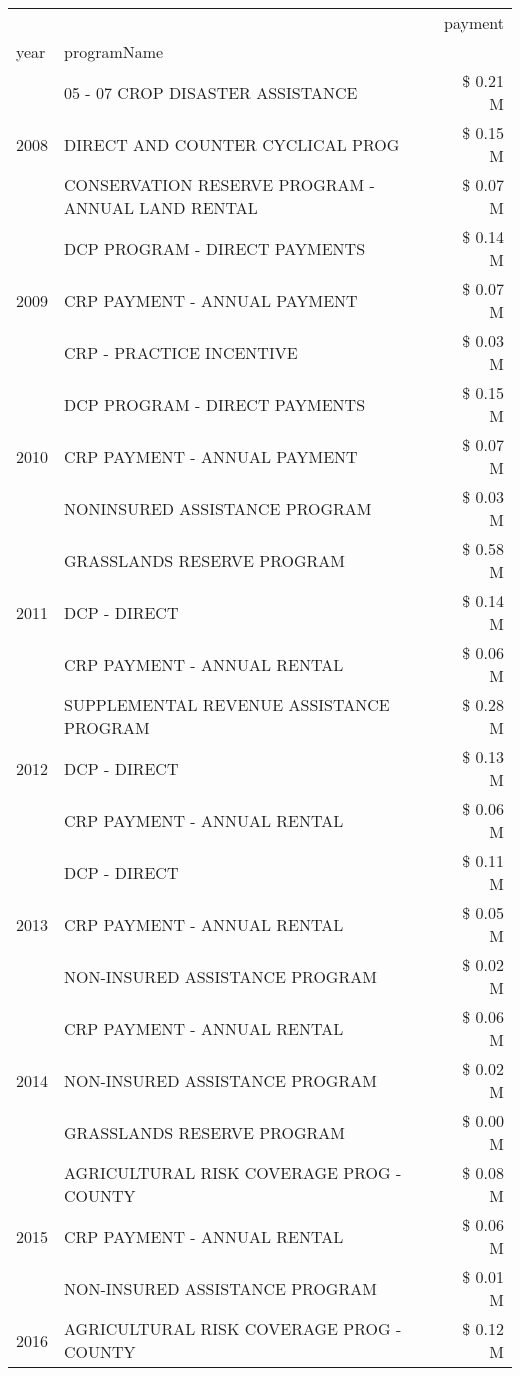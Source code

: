 \begin{tabular}{llr}
\toprule
 &  & payment \\
year & programName &  \\
\midrule
\multirow[t]{3}{*}{2008} & 05 - 07 CROP DISASTER ASSISTANCE & \$ 0.21 M \\
 & DIRECT AND COUNTER CYCLICAL PROG & \$ 0.15 M \\
 & CONSERVATION RESERVE PROGRAM - ANNUAL LAND RENTAL & \$ 0.07 M \\
\cline{1-3}
\multirow[t]{3}{*}{2009} & DCP PROGRAM - DIRECT PAYMENTS & \$ 0.14 M \\
 & CRP PAYMENT - ANNUAL PAYMENT & \$ 0.07 M \\
 & CRP - PRACTICE INCENTIVE & \$ 0.03 M \\
\cline{1-3}
\multirow[t]{3}{*}{2010} & DCP PROGRAM - DIRECT PAYMENTS & \$ 0.15 M \\
 & CRP PAYMENT - ANNUAL PAYMENT & \$ 0.07 M \\
 & NONINSURED ASSISTANCE PROGRAM & \$ 0.03 M \\
\cline{1-3}
\multirow[t]{3}{*}{2011} & GRASSLANDS RESERVE PROGRAM & \$ 0.58 M \\
 & DCP - DIRECT & \$ 0.14 M \\
 & CRP PAYMENT - ANNUAL RENTAL & \$ 0.06 M \\
\cline{1-3}
\multirow[t]{3}{*}{2012} & SUPPLEMENTAL REVENUE ASSISTANCE PROGRAM & \$ 0.28 M \\
 & DCP - DIRECT & \$ 0.13 M \\
 & CRP PAYMENT - ANNUAL RENTAL & \$ 0.06 M \\
\cline{1-3}
\multirow[t]{3}{*}{2013} & DCP - DIRECT & \$ 0.11 M \\
 & CRP PAYMENT - ANNUAL RENTAL & \$ 0.05 M \\
 & NON-INSURED ASSISTANCE PROGRAM & \$ 0.02 M \\
\cline{1-3}
\multirow[t]{3}{*}{2014} & CRP PAYMENT - ANNUAL RENTAL & \$ 0.06 M \\
 & NON-INSURED ASSISTANCE PROGRAM & \$ 0.02 M \\
 & GRASSLANDS RESERVE PROGRAM & \$ 0.00 M \\
\cline{1-3}
\multirow[t]{3}{*}{2015} & AGRICULTURAL RISK COVERAGE PROG - COUNTY & \$ 0.08 M \\
 & CRP PAYMENT - ANNUAL RENTAL & \$ 0.06 M \\
 & NON-INSURED ASSISTANCE PROGRAM & \$ 0.01 M \\
\cline{1-3}
\multirow[t]{3}{*}{2016} & AGRICULTURAL RISK COVERAGE PROG - COUNTY & \$ 0.12 M \\

\end{tabular}
